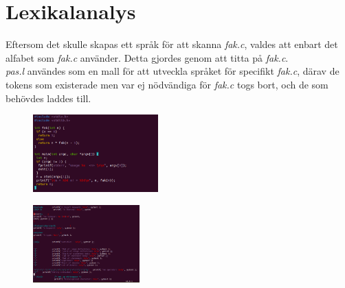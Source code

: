 \section{Lexikalanalys}

Eftersom det skulle skapas ett språk för att skanna \textit{fak.c}, valdes att enbart det alfabet
som \textit{fak.c} använder. Detta gjordes genom att titta på \textit{fak.c}.
\\ \textit{pas.l} användes som en mall för att utveckla språket för specifikt \textit{fak.c},
därav de tokens som existerade men var ej nödvändiga för \textit{fak.c} togs bort, och de som
behövdes laddes till. 

\begin{figure}[!h]
    \includegraphics[width=\linewidth,height=3cm]{bilder/fak_c.png}
    \label{fig:fak c}
\end{figure}


\begin{figure}[!h]
    \includegraphics[width=\linewidth,height=3cm]{bilder/fak_l.png}
    \label{fig:fak l}
\end{figure}


